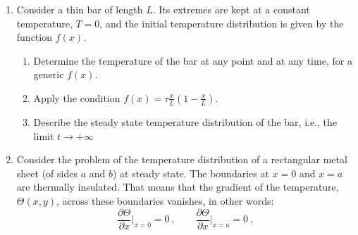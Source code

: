 \documentclass[fleqn]{article}
\begin{document}
\begin{enumerate}
\begin{enumerate}
      \item apply the method of the separation of the variables: write $u(x,t)=X(x)T(t)$ and derive separate equations for $X$ and $T$. \\
        {\it [Hint: at this stage, do not impose the boundary condition, but use it to reason and make a choice for the sign of the separation constant.] }
      
      \item Find the general solution for $X(x)$.  
      
      \item Find the general solution $T(t)$.   Write the full general solution for $u(x,t)$. 
      
      \item  Impose the boundary condition, $u(0,t)=u(L,t)=0$.
      
      \item Discuss what condition must be satisfied to be sure that the colony of bacteria will eventually die out over time (i.e., $u(x,t)$ tends to zero as time tends to $+\infty$ ).
      
    \end{enumerate}
    
    
    \item Consider a thin bar of length $L$. Its extremes are kept at a constant temperature, $T=0$, and the initial temperature distribution is given by the function $f(x)$. 
      \begin{enumerate}
        \item Determine the temperature of the bar at any point and at any time, for a generic $f(x)$.
        
        \item Apply the condition $f(x)=\tau \frac{x}{L}(1-\frac{x}{L})$. 
        
        \item Describe the steady state temperature distribution of the bar, i.e., the limit $t \rightarrow +\infty$
        
      \end{enumerate}
    
    
    \item Consider the problem of the temperature distribution of a rectangular metal sheet (of sides $a$ and $b$) at steady state.  The boundaries at $x = 0$ and $x = a$ are thermally insulated. That means that the gradient of the temperature, $\Theta(x,y)$, across these boundaries vanishes, in other words: 
    $$
    \frac{\partial \Theta}{\partial x}\bigg|_{x=0}=0~, ~~~~~~~~~
    \frac{\partial \Theta}{\partial x}\bigg|_{x=a}=0~, 
    $$


\end{enumerate}
\end{document}
